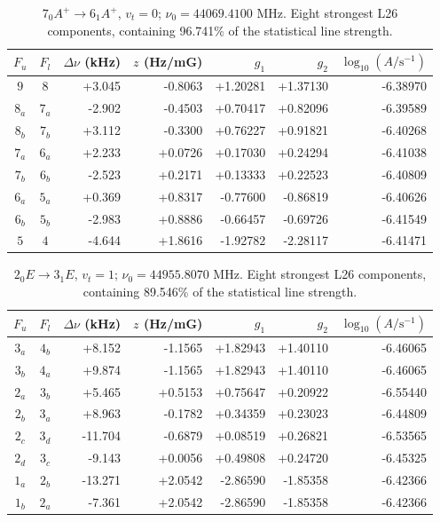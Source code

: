 \begin{table}[!htbp]
\centering\small\renewcommand{\arraystretch}{1.1}\setlength{\tabcolsep}{5pt}
\caption{$7_{0} A^{+}\rightarrow 6_{1} A^{+}$, $v_t=0$; $\nu_0=44069.4100$ MHz. Eight strongest L26 components, containing 96.741\% of the statistical line strength.}
\label{tab:sm-zeeman-44}
\begin{tabular}{ccrrrrr}
\hline\hline
$F_u$ & $F_l$ & $\Delta\nu$ (kHz) & $z$ (Hz/mG) & $g_1$ & $g_2$ & $\log_{10}(A/\mathrm{s}^{-1})$ \\
\hline
$9$ & $8$ & +3.045 & -0.8063 & +1.20281 & +1.37130 & -6.38970\\
$8_{a}$ & $7_{a}$ & -2.902 & -0.4503 & +0.70417 & +0.82096 & -6.39589\\
$8_{b}$ & $7_{b}$ & +3.112 & -0.3300 & +0.76227 & +0.91821 & -6.40268\\
$7_{a}$ & $6_{a}$ & +2.233 & +0.0726 & +0.17030 & +0.24294 & -6.41038\\
$7_{b}$ & $6_{b}$ & -2.523 & +0.2171 & +0.13333 & +0.22523 & -6.40809\\
$6_{a}$ & $5_{a}$ & +0.369 & +0.8317 & -0.77600 & -0.86819 & -6.40626\\
$6_{b}$ & $5_{b}$ & -2.983 & +0.8886 & -0.66457 & -0.69726 & -6.41549\\
$5$ & $4$ & -4.644 & +1.8616 & -1.92782 & -2.28117 & -6.41471\\
\hline\end{tabular}
\end{table}

\begin{table}[!htbp]
\centering\small\renewcommand{\arraystretch}{1.1}\setlength{\tabcolsep}{5pt}
\caption{$2_{0} E\rightarrow 3_{1} E$, $v_t=1$; $\nu_0=44955.8070$ MHz. Eight strongest L26 components, containing 89.546\% of the statistical line strength.}
\label{tab:sm-zeeman-44p9}
\begin{tabular}{ccrrrrr}
\hline\hline
$F_u$ & $F_l$ & $\Delta\nu$ (kHz) & $z$ (Hz/mG) & $g_1$ & $g_2$ & $\log_{10}(A/\mathrm{s}^{-1})$ \\
\hline
$3_{a}$ & $4_{b}$ & +8.152 & -1.1565 & +1.82943 & +1.40110 & -6.46065\\
$3_{b}$ & $4_{a}$ & +9.874 & -1.1565 & +1.82943 & +1.40110 & -6.46065\\
$2_{a}$ & $3_{b}$ & +5.465 & +0.5153 & +0.75647 & +0.20922 & -6.55440\\
$2_{b}$ & $3_{a}$ & +8.963 & -0.1782 & +0.34359 & +0.23023 & -6.44809\\
$2_{c}$ & $3_{d}$ & -11.704 & -0.6879 & +0.08519 & +0.26821 & -6.53565\\
$2_{d}$ & $3_{c}$ & -9.143 & +0.0056 & +0.49808 & +0.24720 & -6.45325\\
$1_{a}$ & $2_{b}$ & -13.271 & +2.0542 & -2.86590 & -1.85358 & -6.42366\\
$1_{b}$ & $2_{a}$ & -7.361 & +2.0542 & -2.86590 & -1.85358 & -6.42366\\
\hline\end{tabular}
\end{table}

